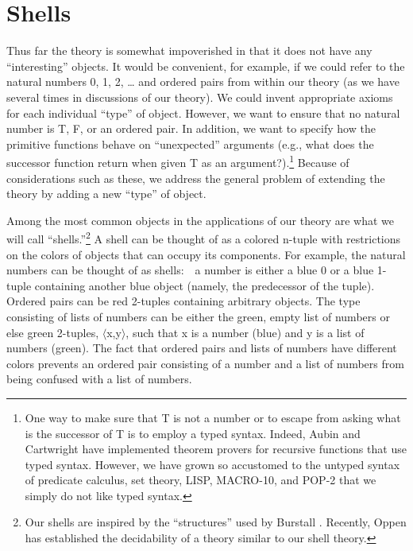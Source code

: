 \documentclass[11pt]{book}
\newcommand{\pubdefaulttextsize}{\large}
\begin{document}
\section{Shells}
\label{SSNEWDATATYPES}
\pubdefaulttextsize
Thus far the theory is somewhat impoverished in that it does not
have any ``interesting'' objects.  It would be convenient,
for example, if we could refer to the natural numbers 0, 1, 2, \ldots{}
and ordered pairs from within our theory (as we have several
times in  discussions of our theory).  We could invent appropriate
axioms for each individual ``type'' of object.  However, we want to
ensure that no natural number is T, F, or an ordered pair.
In addition, we want to specify how the primitive functions behave
on ``unexpected''
arguments (e.g., what does the successor function return when given T as an
argument?).\footnote{One way to make sure that T is not a number or to escape from asking what is the successor of T is to employ a typed syntax.  Indeed, Aubin \cite{AUBIN} and Cartwright \cite{CARTWRIGHT} have implemented theorem provers for recursive functions that use typed syntax. However, we have grown so accustomed to the untyped syntax of predicate calculus, set theory, LISP, MACRO-10, and POP-2 that we simply do not like typed syntax.}
Because of considerations such as these, we address the general problem of extending the theory
by adding a new ``type'' of object.

Among the most common objects in the applications of our theory
are what we will call ``shells.''\footnote{Our shells are inspired by the ``structures'' used by Burstall \cite{BURSTALL}. Recently, Oppen \cite{OPPEN} has established the decidability of a theory similar to our shell theory.}
A shell can be thought of as
a colored n-tuple with restrictions on the colors of objects that
can occupy its components.  For example, the natural numbers
can be thought of  as shells:~~a number is either a blue 0 or a
blue 1-tuple containing another blue object (namely, the predecessor  of the 
tuple).  Ordered pairs can be red 2-tuples
containing arbitrary objects.  The type consisting of lists of numbers
can be either the  green, empty list of numbers or else green 2-tuples, $\langle$x,y$\rangle$, such 
that x is a number (blue) and y is a list of numbers (green).  The fact that 
ordered pairs and
lists of numbers have different colors prevents an ordered pair consisting of
a
number and a list of numbers from being confused with a list of numbers.
\end{document}
